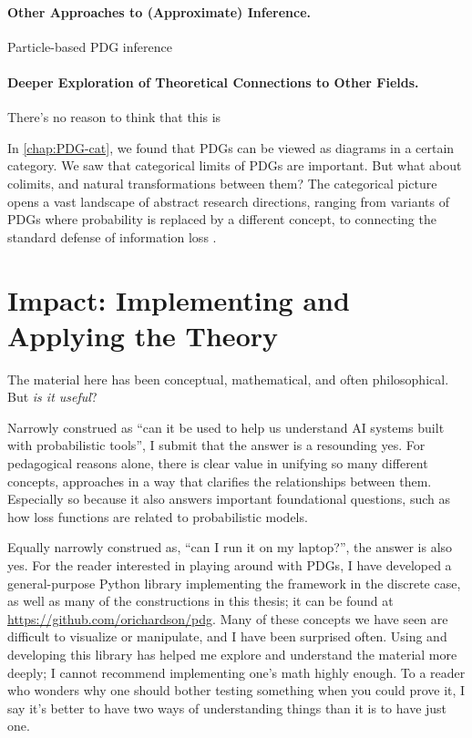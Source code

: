 \paragraph{Other Approaches to (Approximate) Inference.}
Particle-based PDG inference


\paragraph{Deeper Exploration of Theoretical Connections to Other Fields.}
There's no reason to think that this is 

In \cref{chap:PDG-cat}, we found that PDGs can be viewed as diagrams in a certain category. We saw that categorical limits of PDGs are important. But what about colimits, and natural transformations between them? 
The categorical picture opens a vast landscape of abstract research directions, ranging from variants of PDGs where probability is replaced by a different concept, to connecting the standard defense of information loss \citep[Theorem ??]{leinster2021entropy}.


\section{Impact: Implementing and Applying the Theory}

The material here has been conceptual, mathematical, and often philosophical.
But \emph{is it useful}?

Narrowly construed as ``can it be used to help us understand AI systems built with probabilistic tools'', I submit that the answer is a resounding yes. 
For pedagogical reasons alone, there is clear value in unifying so many different concepts, approaches in a way that clarifies the relationships between them.
Especially so because it also answers important foundational questions, such as how loss functions are related to probabilistic models. 

Equally narrowly construed as, ``can I run it on my laptop?'', the answer is also yes. 
For the reader interested in playing around with PDGs, I have developed a general-purpose Python library implementing the framework in the discrete case, as well as many of the constructions in this thesis;
it can be found at \url{https://github.com/orichardson/pdg}.
%
Many of these concepts we have seen are difficult to visualize or manipulate, and I have been surprised often.
Using and developing this library has helped me explore and understand the material more deeply; I cannot recommend implementing one's math highly enough. 
To a reader who wonders why one should bother testing something when you could prove it, I say it's better to have two ways of understanding things than it is to have just one. 

